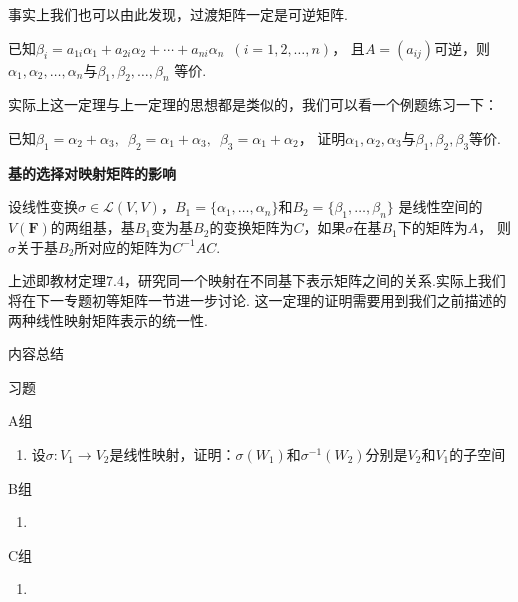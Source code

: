 事实上我们也可以由此发现，过渡矩阵一定是可逆矩阵.
\begin{theorem}
    已知$\beta_i=a_{1i}\alpha_1+a_{2i}\alpha_2+\cdots+a_{ni}\alpha_n\enspace(i=1,2,\ldots,n)$，
    且$A=(a_{ij})$可逆，则$\alpha_1,\alpha_2,\ldots,\alpha_n$与$\beta_1,\beta_2,\ldots,\beta_n$
    等价.
\end{theorem}
实际上这一定理与上一定理的思想都是类似的，我们可以看一个例题练习一下：
\begin{example}
    已知$\beta_1=\alpha_2+\alpha_3,\enspace\beta_2=\alpha_1+\alpha_3,\enspace\beta_3=\alpha_1+\alpha_2$，
    证明$\alpha_1,\alpha_2,\alpha_3$与$\beta_1,\beta_2,\beta_3$等价.
\end{example}
\begin{theorem}
    \textbf{\heiti 基的选择对映射矩阵的影响}

    设线性变换$\sigma \in \mathcal{L}(V,V)$，$B_1=\{\alpha_1,\ldots,\alpha_n\}$和$B_2=\{\beta_1,\ldots,\beta_n\}$
    是线性空间的$V(\mathbf{F})$的两组基，基$B_1$变为基$B_2$的变换矩阵为$C$，如果$\sigma$在基$B_1$下的矩阵为$A$，
    则$\sigma$关于基$B_2$所对应的矩阵为$C^{-1}AC$.
\end{theorem}
上述即教材定理7.4，研究同一个映射在不同基下表示矩阵之间的关系.实际上我们将在下一专题初等矩阵一节进一步讨论.
这一定理的证明需要用到我们之前描述的两种线性映射矩阵表示的统一性.

\vspace{2ex}
\centerline{\heiti \Large 内容总结}

\vspace{2ex}

\centerline{\heiti \Large 习题}
\vspace{2ex}
{\kaishu }
\begin{flushright}
    \kaishu

\end{flushright}
\centerline{\heiti A组}
\begin{enumerate}
    \item 设$\sigma: V_1\to V_2$是线性映射，证明：$\sigma(W_1)$和$\sigma^{-1}(W_2)$分别是$V_2$和$V_1$的子空间
\end{enumerate}
\centerline{\heiti B组}
\begin{enumerate}
    \item
\end{enumerate}
\centerline{\heiti C组}
\begin{enumerate}
    \item
\end{enumerate}

